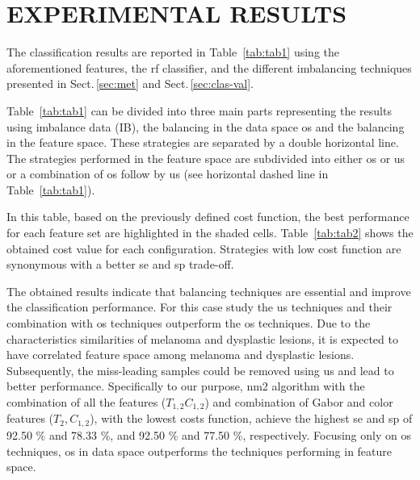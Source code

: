 \graphicspath{ {./content/Experiments-results/figures/} }

\section{\uppercase{Experimental Results}}
\label{sec:exp-res} 

\noindent The classification results are reported in Table~\ref{tab:tab1} using the aforementioned features, the \ac{rf} classifier, and the different imbalancing techniques presented in Sect.\,\ref{sec:met} and Sect.\,\ref{sec:clas-val}. 

Table~\ref{tab:tab1} can be divided into three main parts representing the results using imbalance data (IB), the balancing in the data space \ac{os} and the balancing in the feature space.
These strategies are separated by a double horizontal line.
The strategies performed in the feature space are subdivided into either \ac{os} or \ac{us} or a combination of \ac{os} follow by \ac{us} (see horizontal dashed line in Table~\ref{tab:tab1}).

In this table, based on the previously defined cost function, the best performance for each feature set are highlighted in the shaded cells.
Table~\ref{tab:tab2} shows the obtained cost value for each configuration. 
Strategies with low cost function are synonymous with a better \ac{se} and \ac{sp} trade-off.

The obtained results indicate that balancing techniques are essential and improve the classification performance. 
For this case study the \ac{us} techniques and their combination with \ac{os} techniques outperform the \ac{os} techniques. 
Due to the characteristics similarities of melanoma and dysplastic lesions, it is expected to have correlated feature space among melanoma and dysplastic lesions. 
Subsequently, the miss-leading samples could be removed using \ac{us} and lead to better performance.
Specifically to our purpose, \ac{nm2} algorithm with the combination of all the features ($T_{1,2} C_{1,2}$) and combination of Gabor and color features ($T_{2}, C_{1,2}$), with the lowest costs function, achieve the highest \ac{se} and \ac{sp} of 92.50 \% and 78.33 \%, and 92.50 \% and 77.50 \%, respectively.  
Focusing only on \ac{os} techniques, \ac{os} in data space outperforms the techniques performing in feature space.

